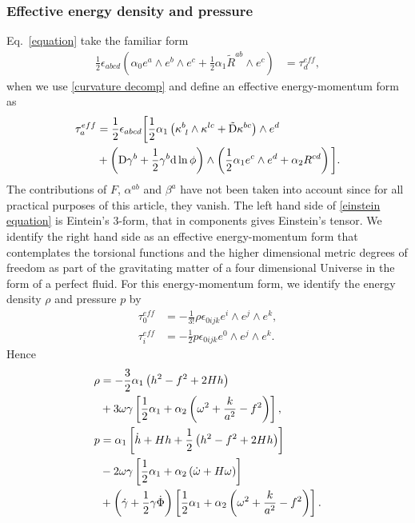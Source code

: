 \documentclass[aps,prd,12pt,superscriptaddress,showpacs,showkeys,longbibliography,reprint]{revtex4-1}
\begin{document}
\subsubsection{Effective energy density and pressure}
Eq.~\eqref{equation} take the familiar form
\begin{align}\label{einstein equation}
\frac{1}{2}\epsilon_{abcd}\left(\alpha_0e^a\wedge e^b\wedge e^c+\frac{1}{2}\alpha_1\tilde{R}^{ab}\wedge e^c\right)&=\tau^{eff}_d,
\end{align}
when we use \eqref{curvature decomp} and define an effective energy-momentum form as
\begin{align}
\tau_a^{eff}&=\frac{1}{2}\epsilon_{abcd}\bigg[\frac{1}{2}\alpha_1\left(\kappa^b_{\ l}\wedge\kappa^{lc}+\tilde{\text{D}}\kappa^{bc}\right)\wedge e^d\notag\\
&+\left(\text{D}\gamma^b+\frac{1}{2}\gamma^b\text{d}\ln\phi\right)\wedge\left(\frac{1}{2}\alpha_1e^c\wedge e^d+\alpha_2R^{cd}\right)\bigg].
\end{align}
The contributions of $F$, $\alpha^{ab}$ and $\beta^a$ have not been taken into account since for all practical purposes of this article, they vanish. The left hand side of \eqref{einstein equation} is Eintein's $3$-form, that in components gives Einstein's tensor. We identify the right hand side as an effective energy-momentum form that contemplates the torsional functions and the higher dimensional metric degrees of freedom as part of the gravitating matter of a four dimensional Universe in the form of a perfect fluid. For this energy-momentum form, we identify the energy density $\rho$ and pressure $p$ by
\begin{align*}
\tau_0^{eff}&=-\frac{1}{3!}\rho\epsilon_{0ijk}e^i\wedge e^j\wedge e^k,\\
\tau_i^{eff}&=-\frac{1}{2}p\epsilon_{0ijk}e^0\wedge e^j\wedge e^k.
\end{align*} 
Hence
\begin{align}\label{rho}
\rho&=-\frac{3}{2}\alpha_1\left(h^2-f^2+2Hh\right)\notag\\
&+3\omega\gamma\left[\frac{1}{2}\alpha_1+\alpha_2\left(\omega^2+\frac{k}{a^2}-f^2\right)\right],\\
\label{presion}
p&=\alpha_1\left[\dot{h}+Hh+\frac{1}{2}\left(h^2-f^2+2Hh\right)\right]\notag\\
&-2\omega\gamma\left[\frac{1}{2}\alpha_1+\alpha_2\left(\dot{\omega}+H\omega\right)\right]\notag\\
&+\left(\dot{\gamma}+\frac{1}{2}\gamma\dot{\Phi}\right)\left[\frac{1}{2}\alpha_1+\alpha_2\left(\omega^2+\frac{k}{a^2}-f^2\right)\right].
\end{align}
\end{document}
